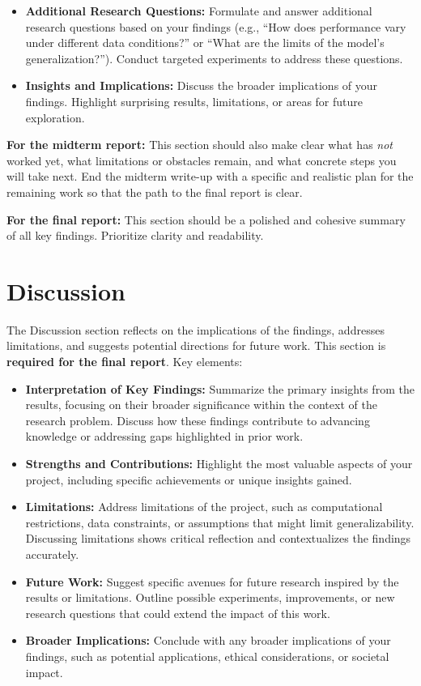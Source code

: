 \documentclass{article}
\begin{document}
\begin{itemize}
    \item \textbf{Additional Research Questions:} Formulate and answer additional research questions based on your findings (e.g., ``How does performance vary under different data conditions?'' or ``What are the limits of the model's generalization?''). Conduct targeted experiments to address these questions.

    \item \textbf{Insights and Implications:} Discuss the broader implications of your findings. Highlight surprising results, limitations, or areas for future exploration.
\end{itemize}

\textbf{For the midterm report:} This section should also make clear what has \emph{not} worked yet, what limitations or obstacles remain, and what concrete steps you will take next. End the midterm write-up with a specific and realistic plan for the remaining work so that the path to the final report is clear.

\textbf{For the final report:} This section should be a polished and cohesive summary of all key findings. Prioritize clarity and readability.

\section{Discussion}

The Discussion section reflects on the implications of the findings, addresses limitations, and suggests potential directions for future work. This section is \textbf{required for the final report}. Key elements:

\begin{itemize}
    \item \textbf{Interpretation of Key Findings:} Summarize the primary insights from the results, focusing on their broader significance within the context of the research problem. Discuss how these findings contribute to advancing knowledge or addressing gaps highlighted in prior work.

    \item \textbf{Strengths and Contributions:} Highlight the most valuable aspects of your project, including specific achievements or unique insights gained.

    \item \textbf{Limitations:} Address limitations of the project, such as computational restrictions, data constraints, or assumptions that might limit generalizability. Discussing limitations shows critical reflection and contextualizes the findings accurately.

    \item \textbf{Future Work:} Suggest specific avenues for future research inspired by the results or limitations. Outline possible experiments, improvements, or new research questions that could extend the impact of this work.

    \item \textbf{Broader Implications:} Conclude with any broader implications of your findings, such as potential applications, ethical considerations, or societal impact.
\end{itemize}
\end{document}
